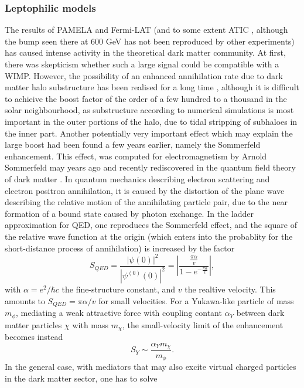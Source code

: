 \documentclass[10pt,aps,pra,reprint,amsmath,amsfonts,amssymb,showpacs]{revtex4-1}
\begin{document}
\subsubsection{Leptophilic models}
\label{sect:LP}
The results of PAMELA \cite{Adriani:2008zr} and Fermi-LAT
\cite{Abdo:2009zk} (and to some extent ATIC
\cite{2008Natur.456..362C}, although the bump seen there at 600 GeV
has not been reproduced by other experiments) has caused intense
activity in the theoretical dark matter community. At first, there was
skepticism whether such a large signal could be compatible with a
WIMP. However, the possibility of an enhanced annihilation rate due to
dark matter halo substructure has been realised for a long time
\cite{1993ApJ...411..439S,Bergstrom:1998zs,Moore:1999nt}, although it
is difficult to achieive the boost factor of the order of a few
hundred to a thousand in the solar neighbourhood, as substructure
according to numerical simulations is most important in the outer
portions of the halo, due to tidal stripping of subhaloes in the inner
part. Another potentially very important effect which may explain the
large boost had been found a few years earlier, namely the Sommerfeld
enhancement. This effect, was computed for electromagnetism by Arnold
Sommerfeld may years ago \cite{sommerfeld} and recently rediscovered
in the quantum field theory of dark matter
\cite{2005PhRvD..71f3528H,2007NuPhB.787..152C,2009PhRvD..79a5014A}.
In quantum mechanics describing electron scattering and electron
positron annihilation, it is caused by the distortion of the plane
wave describing the relative motion of the annihilating particle pair,
due to the near formation of a bound state caused by photon
exchange. In the ladder approximation for QED, one reproduces the
Sommerfeld effect, and the square of the relative wave function at the
origin (which enters into the probablity for the short-distance
process of annihilation) is increased by the factor
\cite{2009PhRvD..79a5014A}
$$
S_{QED}=\frac{|\psi(0)|^2}{|\psi^{(0)}(0)|^2}=|\frac{\frac{\pi\alpha}{v}}{1-e^{-\frac{\pi\alpha}{v}}}|,
$$ with $\alpha =e^2/\hbar c$ the fine-structure constant, and $v$ the
realtive velocity. This amounts to $S_{QED}=\pi\alpha/v$ for small
velocities. For a Yukawa-like particle of mass $m_\phi$, mediating a
weak attractive force with coupling contant $\alpha_Y$ between dark
matter particles $\chi$ with mass $m_\chi$, the small-velocity limit
of the enhancement becomes instead
$$
S_Y\sim\frac{\alpha_Y m_\chi}{m_\phi}.
$$ In the general case, with mediators that may also excite virtual
charged particles in the dark matter sector, one has to solve
\end{document}
